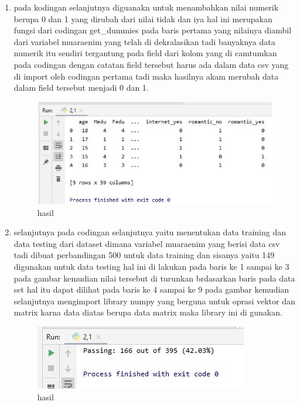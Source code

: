 \begin{enumerate}
\item pada kodingan selanjutnya diguanakn untuk menambahkan nilai numerik berupa 0 dan 1 yang dirubah dari nilai tidak dan iya hal ini merupakan fungsi dari codingan get\_dummies pada baris pertama yang nilainya diambil dari variabel muaraenim yang telah di dekralasikan tadi banyaknya data numerik itu sendiri tergantung pada field dari kolom yang di camtumkan pada codingan dengan catatan field tersebut harus ada dalam data csv yang di import oleh codingan pertama tadi maka hasilnya akam merubah data dalam field tersebut menjadi 0 dan 1.

\begin{figure}[ht]
\centering
\includegraphics[scale=0.5]{figures/1174042/chapter2/2,3.JPG}
\caption{hasil}
\label{contoh}
\end{figure}

\item selanjutnya pada codingan selanjutnya yaitu menentukan data training dan data testing dari dataset dimana variabel muaraenim yang berisi data csv tadi dibuat perbandingan 500 untuk data training dan sisanya yaitu 149 digunakan untuk data testing hal ini di lakukan pada baris ke 1 sampai ke 3 pada gambar kemudian nilai tersebut di turunkan  brdasarkan baris pada data set hal itu dapat dilihat pada baris ke 4 sampai ke 9 pada gambar kemudian selanjutnya mengimport library numpy yang berguna untuk oprasi vektor dan matrix karna data diatas berupa data matrix maka library ini di gunakan.

\begin{figure}[ht]
\centering
\includegraphics[scale=0.5]{figures/1174042/chapter2/2,4.JPG}
\caption{hasil}
\label{contoh}
\end{figure}


\end{enumerate}

